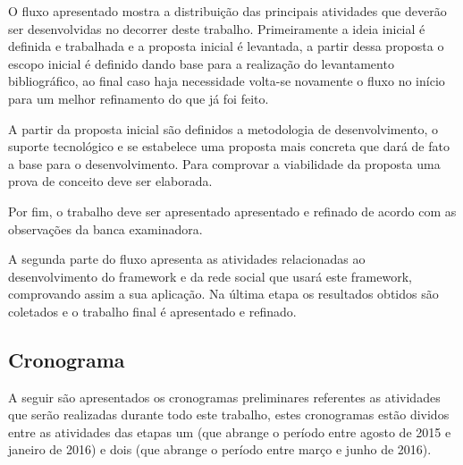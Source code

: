 O fluxo apresentado mostra a distribuição das principais atividades que deverão ser desenvolvidas no decorrer deste trabalho. Primeiramente a ideia inicial é definida e trabalhada e a proposta inicial é levantada, a partir dessa proposta o escopo inicial é definido dando base para a realização do levantamento bibliográfico, ao final caso haja necessidade volta-se novamente o fluxo no início para um melhor refinamento do que já foi feito.

A partir da proposta inicial são definidos a metodologia de desenvolvimento, o suporte tecnológico e se estabelece uma proposta mais concreta que dará de fato a base para o desenvolvimento. Para comprovar a viabilidade da proposta uma prova de conceito deve ser elaborada.

Por fim, o trabalho deve ser apresentado apresentado e refinado de acordo com as observações da banca examinadora.

A segunda parte do fluxo apresenta as atividades relacionadas ao desenvolvimento do framework e da rede social que usará este framework, comprovando assim a sua aplicação. Na última etapa os resultados obtidos são coletados e o trabalho final é apresentado e refinado.

\subsection{Cronograma}

A seguir são apresentados os cronogramas preliminares referentes as atividades que serão realizadas durante todo este trabalho, estes cronogramas estão dividos entre as atividades das etapas um (que abrange o período entre agosto de 2015 e janeiro de 2016) e dois (que abrange o período entre março e junho de 2016).

